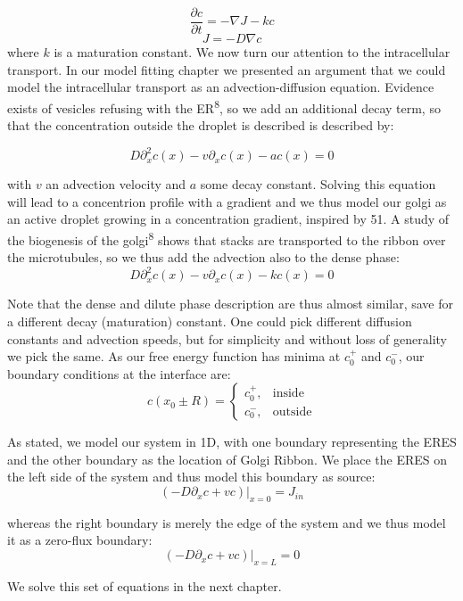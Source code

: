 \documentclass{Dissertate}
\begin{document}
\[
\frac{\partial c}{\partial t} = -\nabla J -kc
\] \[
J = - D \nabla c
\] where \(k\) is a maturation constant. We now turn our attention to
the intracellular transport. In our model fitting chapter we presented
an argument that we could model the intracellular transport as an
advection-diffusion equation. Evidence exists of vesicles refusing with
the ER\textsuperscript{8}, so we add an additional decay term, so that
the concentration outside the droplet is described is described by:

\begin{equation}
D\partial_x^2 c(x) - v\partial_xc(x)-ac(x)=0
\label{eq:cinside}\end{equation}

with \(v\) an advection velocity and \(a\) some decay constant. Solving
this equation will lead to a concentrion profile with a gradient and we
thus model our golgi as an active droplet growing in a concentration
gradient, inspired by 51. A study of the biogenesis of the
golgi\textsuperscript{8} shows that stacks are transported to the ribbon
over the microtubules, so we thus add the advection also to the dense
phase: \begin{equation}
D\partial_x^2 c(x) - v\partial_xc(x)-kc(x)=0
\label{eq:coutside}\end{equation}

Note that the dense and dilute phase description are thus almost
similar, save for a different decay (maturation) constant. One could
pick different diffusion constants and advection speeds, but for
simplicity and without loss of generality we pick the same. As our free
energy function has minima at \(c_0^+\) and \(c_0^{-}\), our boundary
conditions at the interface are: \[
c(x_0\pm R)=
\begin{cases}
    c_0^+,& \text{inside}\\
    c_0^-,& \text{outside}
\end{cases}
\]

As stated, we model our system in 1D, with one boundary representing the
ERES and the other boundary as the location of Golgi Ribbon. We place
the ERES on the left side of the system and thus model this boundary as
source: \[
(-D\partial_xc+vc)|_{x=0} = J_{in}
\]

whereas the right boundary is merely the edge of the system and we thus
model it as a zero-flux boundary: \[
(-D\partial_xc+vc)|_{x=L} = 0
\]

We solve this set of equations in the next chapter.
\end{document}
